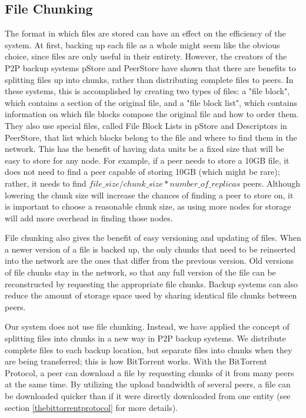 \documentclass[12pt]{report}
\begin{document}
\subsection{File Chunking} \label{sec:filechunking}
The format in which files are stored can have an effect on the efficiency of the system. At first, backing up each file as a whole might seem like the obvious choice, since files are only useful in their entirety. However, the creators of the P2P backup systems pStore and PeerStore have shown that there are benefits to splitting files up into chunks, rather than distributing complete files to peers. In these systems, this is accomplished by creating two types of files: a "file block", which contains a section of the original file, and a "file block list", which contains information on which file blocks compose the original file and how to order them. They also use special files, called File Block Lists in pStore and Descriptors in PeerStore, that list which blocks belong to the file and where to find them in the network. This has the benefit of having data units be a fixed size that will be easy to store for any node. For example, if a peer needs to store a 10GB file, it does not need to find a peer capable of storing 10GB (which might be rare); rather, it needs to find $file\_size/chunk\_size*number\_of\_replicas$ peers. Although lowering the chunk size will increase the chances of finding a peer to store on, it is important to choose a reasonable chunk size, as using more nodes for storage will add more overhead in finding those nodes.

File chunking also gives the benefit of easy versioning and updating of files. When a newer version of a file is backed up, the only chunks that need to be reinserted into the network are the ones that differ from the previous version. Old versions of file chunks stay in the network, so that any full version of the file can be reconstructed by requesting the appropriate file chunks. Backup systems can also reduce the amount of storage space used by sharing identical file chunks between peers.

Our system does not use file chunking. Instead, we have applied the concept of splitting files into chunks in a new way in P2P backup systems. We distribute complete files to each backup location, but separate files into chunks when they are being transferred; this is how BitTorrent works. With the BitTorrent Protocol, a peer can download a file by requesting chunks of it from many peers at the same time. By utilizing the upload bandwidth of several peers, a file can be downloaded quicker than if it were directly downloaded from one entity (see section \ref{thebittorrentprotocol} for more details).
\end{document}
